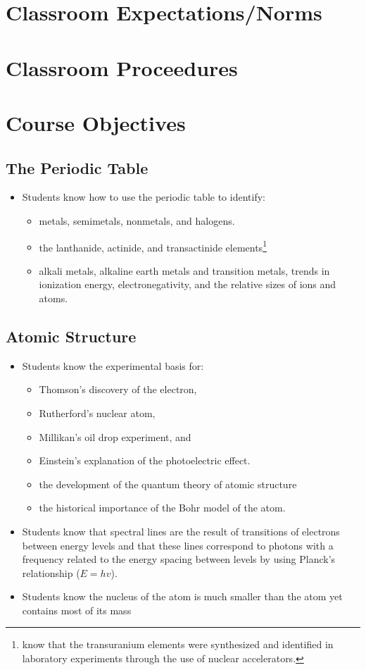 \documentclass[11pt]{article}
\begin{document}
\section{Classroom Expectations/Norms}
\label{sec:orgb650d08}

\section{Classroom Proceedures}
\label{sec:orga944dd2}

\section{Course Objectives}
\label{sec:orgc0411cb}

\subsection{The Periodic Table}
\label{sec:org21fed72}
\begin{itemize}
\item Students know how to use the periodic table to identify:
\begin{itemize}
\item metals, semimetals, nonmetals, and halogens.
\item the lanthanide, actinide, and transactinide elements\footnote{know that the transuranium elements were synthesized and identified in laboratory experiments through the use of nuclear accelerators.}
\item alkali metals, alkaline earth metals and transition metals, trends in ionization energy, electronegativity, and the relative sizes of ions and atoms.
\end{itemize}
\end{itemize}
\subsection{Atomic Structure}
\label{sec:orgb1ba93c}
\begin{itemize}
\item Students know the experimental basis for:
\begin{itemize}
\item Thomson's discovery of the electron,
\item Rutherford's nuclear atom,
\item Millikan's oil drop experiment, and
\item Einstein's explanation of the photoelectric effect.
\item the development of the quantum theory of atomic structure
\item the historical importance of the Bohr model of the atom.
\end{itemize}
\item Students know that spectral lines are the result of transitions of electrons between energy levels and that these lines correspond to photons with a frequency related to the energy spacing between levels by using Planck's relationship (\(E = hv\)).
\item Students know the nucleus of the atom is much smaller than the atom yet contains most of its mass
\end{itemize}
\end{document}

